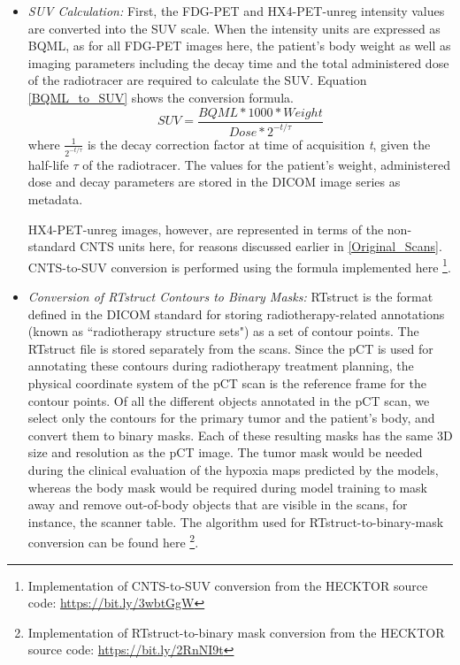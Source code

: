 \begin{itemize}

    \item  \textit{SUV Calculation:} First, the FDG-PET and HX4-PET-unreg intensity values are converted into the SUV scale. When the intensity units are expressed as BQML, as for all FDG-PET images here, the patient's body weight as well as imaging parameters including the decay time and the total administered dose of the radiotracer are required to calculate the SUV. Equation \ref{BQML_to_SUV} shows the conversion formula. 
    \begin{equation}
        SUV = \frac{BQML * 1000 * Weight}{Dose * 2^{-t/\tau}} 
        \label{BQML_to_SUV}
    \end{equation}
    where $\frac{1}{2^{-t/\tau}}$ is the decay correction factor at time of acquisition \textit{t}, given the half-life $\tau$ of the radiotracer. The values for the patient's weight, administered dose and decay parameters are stored in the DICOM image series as metadata. 
    
    HX4-PET-unreg images, however, are represented in terms of the non-standard CNTS units here, for reasons discussed earlier in \ref{Original_Scans}. CNTS-to-SUV conversion is performed using the formula implemented here \footnote{Implementation of CNTS-to-SUV conversion from the HECKTOR source code: \url{https://bit.ly/3wbtGgW}}.
    
    \item  \textit{Conversion of RTstruct Contours to Binary Masks:} RTstruct is the format defined in the DICOM standard for storing radiotherapy-related annotations (known as ``radiotherapy structure sets") as a set of contour points. The RTstruct file is stored separately from the scans. Since the pCT is used for annotating these contours during radiotherapy treatment planning, the physical coordinate system of the pCT scan is the reference frame for the contour points. Of all the different objects annotated in the pCT scan, we select only the contours for the primary tumor and the patient's body, and convert them to binary masks. Each of these resulting masks has the same 3D size and resolution as the pCT image. The tumor mask would be needed during the clinical evaluation of the hypoxia maps predicted by the models, whereas the body mask would be required during model training to mask away and remove out-of-body objects that are visible in the scans, for instance, the scanner table. The algorithm used for RTstruct-to-binary-mask conversion can be found here \footnote{Implementation of RTstruct-to-binary mask conversion from the HECKTOR source code: \url{https://bit.ly/2RnNI9t}}.

\end{itemize}

